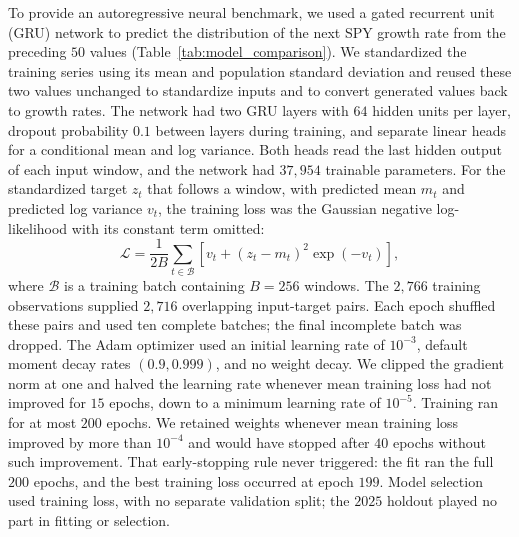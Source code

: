To provide an autoregressive neural benchmark, we used a gated
recurrent unit (GRU) network to predict the distribution of the next
SPY growth rate from the preceding $50$ values
(Table~\ref{tab:model_comparison}). We standardized the training
series using its mean and population standard deviation and reused
these two values unchanged to standardize inputs and to convert
generated values back to growth rates. The network had two GRU layers
with $64$ hidden units per layer, dropout probability $0.1$ between
layers during training, and separate linear heads for a conditional
mean and log variance. Both heads read the last hidden output of each
input window, and the network had $37{,}954$ trainable parameters.
For the standardized target $z_t$ that follows a window, with
predicted mean $m_t$ and predicted log variance $v_t$, the training
loss was the Gaussian negative log-likelihood with its constant term
omitted:
\begin{equation}
 \mathcal L=\frac{1}{2B}\sum_{t\in\mathcal B}
       \left[v_t+(z_t-m_t)^2\exp(-v_t)\right],
 \label{eq:gru-loss}
\end{equation}
where $\mathcal B$ is a training batch containing $B=256$ windows.
The $2{,}766$ training observations supplied $2{,}716$ overlapping
input-target pairs. Each epoch shuffled these pairs and used ten
complete batches; the final incomplete batch was dropped. The Adam
optimizer used an initial learning rate of $10^{-3}$, default moment
decay rates $(0.9,0.999)$, and no weight decay. We clipped the
gradient norm at one and halved the learning rate whenever mean
training loss had not improved for $15$ epochs, down to a minimum
learning rate of $10^{-5}$. Training ran for at most $200$ epochs. We
retained weights whenever mean training loss improved by more than
$10^{-4}$ and would have stopped after $40$ epochs without such
improvement. That early-stopping rule never triggered: the fit ran
the full $200$ epochs, and the best training loss occurred at epoch
$199$. Model selection used training loss, with no separate
validation split; the $2025$ holdout played no part in fitting or
selection.

